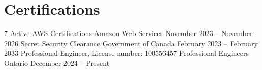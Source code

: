 \documentclass[a4paper,11pt]{article}
\begin{document}
\sectionsep
% 

\section{Certifications}
\begin{subheading}
    \resumeCert
    {7 Active AWS Certifications \href{https://www.credly.com/users/christian-boin}{\faExternalLink} }
    {Amazon Web Services}
    {November 2023 -- November 2026}
    \resumeCert
	{Secret Security Clearance}
	{Government of Canada}
	{February 2023 -- February 2033}
	\resumeCert
	{Professional Engineer, License number: 100556457}
	{Professional Engineers Ontario}
	{December 2024 -- Present}
\end{subheading}

% 
\end{document}
